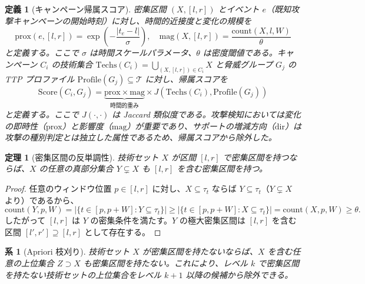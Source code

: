 \documentclass[11pt]{article}
\newtheorem{definition}{定義}
\newtheorem{theorem}{定理}
\newtheorem{corollary}{系}
\begin{document}
\begin{definition}[キャンペーン帰属スコア]\label{def:attribution}
密集区間 $(X, [l,r])$ とイベント $e$（既知攻撃キャンペーンの開始時刻）に対し、時間的近接度と変化の規模を
\begin{equation}
\mathrm{prox}(e, [l,r]) = \exp\!\left(-\frac{|t_e - l|}{\sigma}\right), \quad
\mathrm{mag}(X, [l,r]) = \frac{\mathrm{count}(X, l, W)}{\theta}
\end{equation}
と定義する。ここで $\sigma$ は時間スケールパラメータ、$\theta$ は密度閾値である。キャンペーン $C_i$ の技術集合 $\mathrm{Techs}(C_i) = \bigcup_{(X, [l,r]) \in C_i} X$ と脅威グループ $G_j$ の TTP プロファイル $\mathrm{Profile}(G_j) \subseteq \mathcal{T}$ に対し、帰属スコアを
\begin{equation}
\mathrm{Score}(C_i, G_j) = \underbrace{\mathrm{prox} \times \mathrm{mag}}_{\text{時間的重み}} \times J(\mathrm{Techs}(C_i), \mathrm{Profile}(G_j))
\end{equation}
と定義する。ここで $J(\cdot, \cdot)$ は Jaccard 類似度である。攻撃検知においては変化の即時性（$\mathrm{prox}$）と影響度（$\mathrm{mag}$）が重要であり、サポートの増減方向（$\mathrm{dir}$）は攻撃の種別判定とは独立した属性であるため、帰属スコアから除外した。
\end{definition}

\begin{theorem}[密集区間の反単調性]\label{thm:apriori}
技術セット $X$ が区間 $[l, r]$ で密集区間を持つならば、$X$ の任意の真部分集合 $Y \subsetneq X$ も $[l, r]$ を含む密集区間を持つ。
\end{theorem}

\begin{proof}
任意のウィンドウ位置 $p \in [l, r]$ に対し、$X \subseteq \tau_t$ ならば $Y \subseteq \tau_t$（$Y \subsetneq X$ より）であるから、
\[
\mathrm{count}(Y, p, W) = |\{t \in [p, p+W] : Y \subseteq \tau_t\}| \geq |\{t \in [p, p+W] : X \subseteq \tau_t\}| = \mathrm{count}(X, p, W) \geq \theta.
\]
したがって $[l, r]$ は $Y$ の密集条件を満たす。$Y$ の極大密集区間は $[l, r]$ を含む区間 $[l', r'] \supseteq [l, r]$ として存在する。
\end{proof}

\begin{corollary}[Apriori 枝刈り]\label{cor:pruning}
技術セット $X$ が密集区間を持たないならば、$X$ を含む任意の上位集合 $Z \supset X$ も密集区間を持たない。これにより、レベル $k$ で密集区間を持たない技術セットの上位集合をレベル $k+1$ 以降の候補から除外できる。
\end{corollary}
\end{document}
